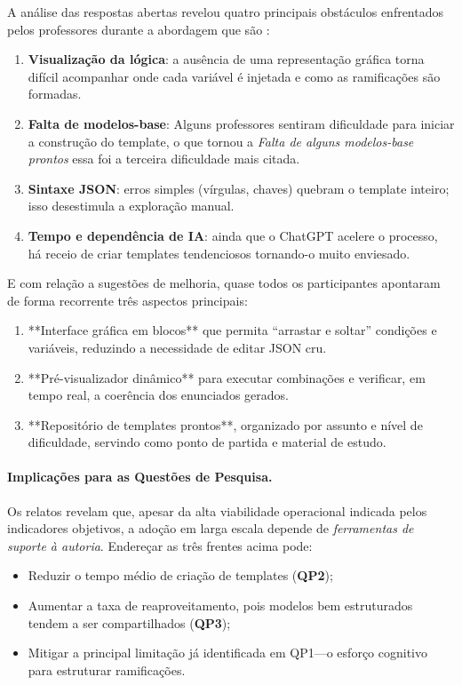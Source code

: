 A análise das respostas abertas revelou quatro principais obstáculos enfrentados pelos professores durante a abordagem que são : 

\begin{enumerate}[label=(\alph*)]
    \item \textbf{Visualização da lógica}: a ausência de uma representação gráfica torna difícil acompanhar onde cada variável é injetada e como as ramificações são formadas.
    \item \textbf{Falta de modelos-base}: Alguns professores sentiram dificuldade para iniciar a construção do template, o que tornou a \emph{Falta de alguns modelos-base prontos} essa foi a terceira dificuldade mais citada.
    \item \textbf{Sintaxe JSON}: erros simples (vírgulas, chaves) quebram o template inteiro; isso desestimula a exploração manual.
    \item \textbf{Tempo e dependência de IA}: ainda que o ChatGPT acelere o processo, há receio de criar templates tendenciosos tornando-o muito enviesado.
\end{enumerate}

E com relação a sugestões de melhoria, quase todos os participantes apontaram de forma recorrente três aspectos principais:

\begin{enumerate}[label=(\roman*)]
    \item **Interface gráfica em blocos** que permita “arrastar e soltar” condições e variáveis, reduzindo a necessidade de editar JSON cru.
    \item **Pré-visualizador dinâmico** para executar combinações e verificar, em tempo real, a coerência dos enunciados gerados.
    \item **Repositório de templates prontos**, organizado por assunto e nível de dificuldade, servindo como ponto de partida e material de estudo.
\end{enumerate}

\paragraph{Implicações para as Questões de Pesquisa.}
Os relatos revelam que, apesar da alta viabilidade operacional indicada pelos indicadores objetivos, a adoção em larga escala depende de \emph{ferramentas de suporte à autoria}.  Endereçar as três frentes acima pode:

\begin{itemize}
    \item Reduzir o tempo médio de criação de templates (\textbf{QP2});
    \item Aumentar a taxa de reaproveitamento, pois modelos bem estruturados tendem a ser compartilhados (\textbf{QP3});
    \item Mitigar a principal limitação já identificada em QP1—o esforço cognitivo para estruturar ramificações.
\end{itemize}

